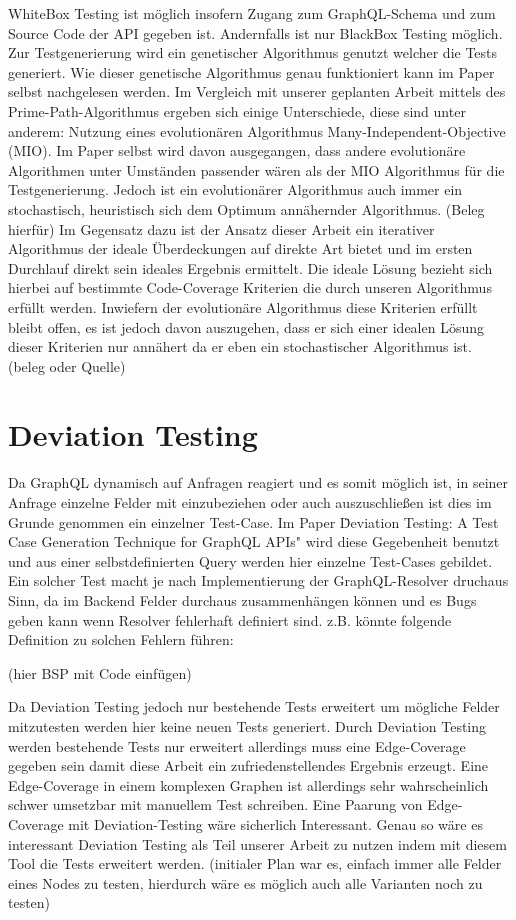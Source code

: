 WhiteBox Testing ist möglich insofern Zugang zum GraphQL-Schema und zum Source Code der API gegeben ist.
Andernfalls ist nur BlackBox Testing möglich.
Zur Testgenerierung wird ein genetischer Algorithmus genutzt welcher die Tests generiert.
Wie dieser genetische Algorithmus genau funktioniert kann im Paper selbst nachgelesen werden\cite{belhadi2022whitebox}.
Im Vergleich mit unserer geplanten Arbeit mittels des Prime-Path-Algorithmus ergeben sich einige Unterschiede, diese sind
unter anderem: Nutzung eines evolutionären Algorithmus Many-Independent-Objective (MIO).
Im Paper selbst wird davon ausgegangen, dass andere evolutionäre Algorithmen unter Umständen passender wären als der MIO Algorithmus
für die Testgenerierung.
Jedoch ist ein evolutionärer Algorithmus auch immer ein stochastisch, heuristisch sich dem Optimum annähernder Algorithmus. (Beleg hierfür)
Im Gegensatz dazu ist der Ansatz dieser Arbeit ein iterativer Algorithmus der ideale Überdeckungen auf direkte Art bietet
und im ersten Durchlauf direkt sein ideales Ergebnis ermittelt.
Die ideale Lösung bezieht sich hierbei auf bestimmte Code-Coverage Kriterien die durch unseren Algorithmus erfüllt werden.
Inwiefern der evolutionäre Algorithmus diese Kriterien erfüllt bleibt offen, es ist jedoch davon auszugehen, dass er sich einer idealen Lösung dieser Kriterien nur
annähert da er eben ein stochastischer Algorithmus ist. (beleg oder Quelle)

\section{Deviation Testing}

Da GraphQL dynamisch auf Anfragen reagiert und es somit möglich ist, in seiner Anfrage einzelne Felder mit einzubeziehen
oder auch auszuschließen ist dies im Grunde genommen ein einzelner Test-Case.
Im Paper \" Deviation Testing: A Test Case Generation Technique for GraphQL APIs" wird diese Gegebenheit benutzt und
aus einer selbstdefinierten Query werden hier einzelne Test-Cases gebildet. Ein solcher Test macht je nach Implementierung
der GraphQL-Resolver druchaus Sinn, da im Backend Felder durchaus zusammenhängen können und es Bugs geben kann wenn
Resolver fehlerhaft definiert sind. z.B. könnte folgende Definition zu solchen Fehlern führen:

(hier BSP mit Code einfügen)

Da Deviation Testing jedoch nur bestehende Tests erweitert um mögliche Felder mitzutesten werden hier keine neuen Tests generiert.
Durch Deviation Testing werden bestehende Tests nur erweitert allerdings muss eine Edge-Coverage gegeben sein damit diese Arbeit
ein zufriedenstellendes Ergebnis erzeugt. Eine Edge-Coverage in einem komplexen Graphen ist allerdings sehr wahrscheinlich
schwer umsetzbar mit manuellem Test schreiben. Eine Paarung von Edge-Coverage mit Deviation-Testing wäre sicherlich Interessant.
Genau so wäre es interessant Deviation Testing als Teil unserer Arbeit zu nutzen indem mit diesem Tool die Tests erweitert werden.
(initialer Plan war es, einfach immer alle Felder eines Nodes zu testen, hierdurch wäre es möglich auch alle Varianten noch zu testen)

